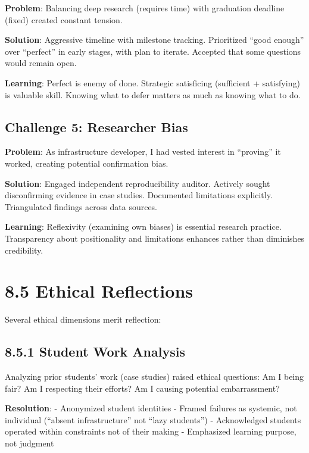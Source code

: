 \documentclass[
  oneside,
  open=any]{scrbook}
\begin{document}
\textbf{Problem}: Balancing deep research (requires time) with
graduation deadline (fixed) created constant tension.

\textbf{Solution}: Aggressive timeline with milestone tracking.
Prioritized ``good enough'' over ``perfect'' in early stages, with plan
to iterate. Accepted that some questions would remain open.

\textbf{Learning}: Perfect is enemy of done. Strategic satisficing
(sufficient + satisfying) is valuable skill. Knowing what to defer
matters as much as knowing what to do.

\subsection{Challenge 5: Researcher
Bias}\label{challenge-5-researcher-bias}

\textbf{Problem}: As infrastructure developer, I had vested interest in
``proving'' it worked, creating potential confirmation bias.

\textbf{Solution}: Engaged independent reproducibility auditor. Actively
sought disconfirming evidence in case studies. Documented limitations
explicitly. Triangulated findings across data sources.

\textbf{Learning}: Reflexivity (examining own biases) is essential
research practice. Transparency about positionality and limitations
enhances rather than diminishes credibility.

\section{8.5 Ethical Reflections}\label{ethical-reflections}

Several ethical dimensions merit reflection:

\subsection{8.5.1 Student Work Analysis}\label{student-work-analysis}

Analyzing prior students' work (case studies) raised ethical questions:
Am I being fair? Am I respecting their efforts? Am I causing potential
embarrassment?

\textbf{Resolution}: - Anonymized student identities - Framed failures
as systemic, not individual (``absent infrastructure'' not ``lazy
students'') - Acknowledged students operated within constraints not of
their making - Emphasized learning purpose, not judgment
\end{document}
